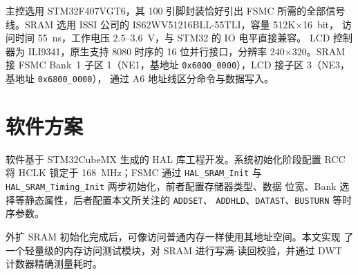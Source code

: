 主控选用 STM32F407VGT6，其 100 引脚封装恰好引出 FSMC 所需的全部信号
线。SRAM 选用 ISSI 公司的 IS62WV51216BLL-55TLI，容量 512K$\times$16~bit，
访问时间 55~ns，工作电压 2.5--3.6~V，与 STM32 的 IO 电平直接兼容。
LCD 控制器为 ILI9341，原生支持 8080 时序的 16 位并行接口，分辨率
240$\times$320。SRAM 接 FSMC Bank~1 子区 1（NE1，基地址
\texttt{0x6000\_0000}），LCD 接子区 3（NE3，基地址 \texttt{0x6800\_0000}），
通过 A6 地址线区分命令与数据写入。

\section{软件方案}
\label{sec:sw}

软件基于 STM32CubeMX 生成的 HAL 库工程开发。系统初始化阶段配置 RCC 将
HCLK 锁定于 168~MHz；FSMC 通过 \texttt{HAL\_SRAM\_Init} 与
\texttt{HAL\_SRAM\_Timing\_Init} 两步初始化，前者配置存储器类型、数据
位宽、Bank 选择等静态属性，后者配置本文所关注的 \texttt{ADDSET}、
\texttt{ADDHLD}、\texttt{DATAST}、\texttt{BUSTURN} 等时序参数。

外扩 SRAM 初始化完成后，可像访问普通内存一样使用其地址空间。本文实现
了一个轻量级的内存访问测试模块，对 SRAM 进行写满-读回校验，并通过 DWT
计数器精确测量耗时。
